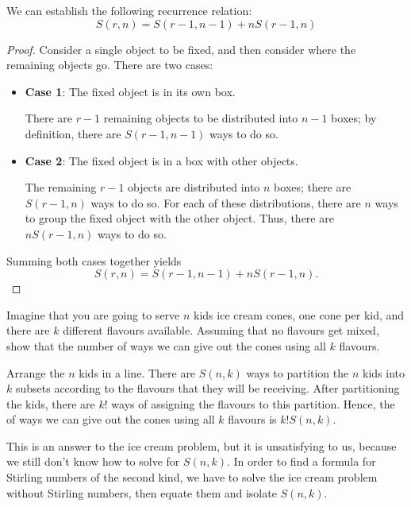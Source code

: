 We can establish the following recurrence relation:
\begin{equation}
S(r,n)=S(r-1,n-1)+nS(r-1,n)
\end{equation}

\begin{proof}
Consider a single object to be fixed, and then consider where the remaining objects go. There are two cases:
\begin{itemize}
\item \textbf{Case 1}: The fixed object is in its own box.

There are $r-1$ remaining objects to be distributed into $n-1$ boxes; by definition, there are $S(r-1,n-1)$ ways to do so.

\item \textbf{Case 2}: The fixed object is in a box with other objects.

The remaining $r-1$ objects are distributed into $n$ boxes; there are $S(r-1,n)$ ways to do so. For each of these distributions, there are $n$ ways to group the fixed object with the other object. Thus, there are $nS(r-1,n)$ ways to do so.
\end{itemize}
Summing both cases together yields
\[S(r,n)=S(r-1,n-1)+nS(r-1,n).\]
\end{proof}

\begin{exercise}
Imagine that you are going to serve $n$ kids ice cream cones, one cone per kid, and there are $k$ different flavours available. Assuming that no flavours get mixed, show that the number of ways we can give out the cones using all $k$ flavours. 
\end{exercise}

\begin{solution}
Arrange the $n$ kids in a line. There are $S(n,k)$ ways to partition the $n$ kids into $k$ subsets according to the flavours that they will be receiving. After partitioning the kids, there are $k!$ ways of assigning the flavours to this partition. Hence, the of ways we can give out the cones using all $k$ flavours is $k!S(n,k)$.
\end{solution}

This is an answer to the ice cream problem, but it is unsatisfying to us, because we still don't know how to solve for $S(n,k)$. In order to find a formula for Stirling numbers of the second kind, we have to solve the ice cream problem without Stirling numbers, then equate them and isolate $S(n,k)$.

